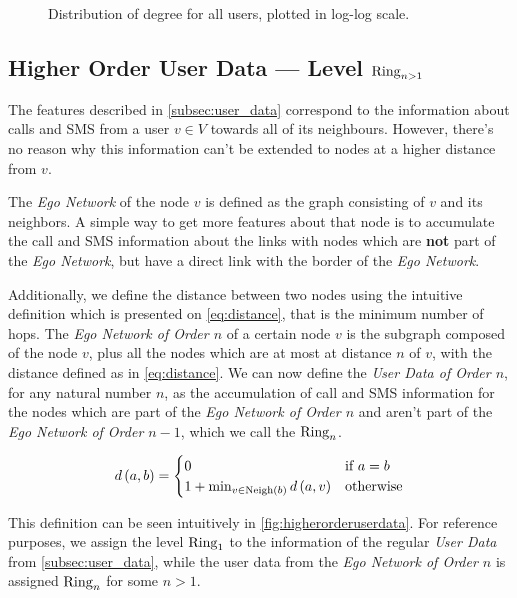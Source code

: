 \begin{figure}
\caption{Distribution of degree for all users, plotted in log-log scale.}
\label{fig:contacts}
\end{figure}


\subsection{Higher Order User Data --- Level $\operatorname{Ring}_{n > 1}$}

\label{subsec:higherorderuserdata}

The features described in \cref{subsec:user_data} correspond to the information about calls and SMS from a user $v \in V$ towards all of its neighbours. However, there's no reason why this information can't be extended to nodes at a higher distance from $v$.

The \emph{Ego Network} of the node $v$ is defined as the graph consisting of $v$ and its neighbors. A simple way to get more features about that node is to accumulate the call and SMS information about the links with nodes which are \textbf{not} part of the \emph{Ego Network}, but have a direct link with the border of the \emph{Ego Network}.

Additionally, we define the distance between two nodes using the intuitive definition which is presented on \cref{eq:distance}, that is the minimum number of hops.
The \emph{Ego Network of Order $n$} of a certain node $v$ is the subgraph composed of the node $v$, plus all the nodes which are at most at distance $n$ of $v$, with the distance defined as in \cref{eq:distance}.
We can now define the \emph{User Data of Order $n$}, for any natural number $n$, as the accumulation of call and SMS information for the nodes which are part of the \emph{Ego Network of Order $n$} and aren't part of the \emph{Ego Network of Order $n - 1$}, which we call the $\operatorname{Ring}_n$.

\begin{equation}
d \left( a, b \right) =
\begin{cases}
	0 & \text{if } a = b \\
	1 + \min_{v \in \operatorname{Neigh} \left(b \right)} d \left( a, v \right) & \text{otherwise}
\end{cases}
\label{eq:distance}
\end{equation}

This definition can be seen intuitively in \cref{fig:higherorderuserdata}. For reference purposes, we assign the level $\operatorname{Ring}_1$ to the information of the regular \emph{User Data} from \cref{subsec:user_data}, while the user data from the \emph{Ego Network of Order $n$} is assigned $\operatorname{Ring}_n$ for some $n > 1$\footnotemark{}.

